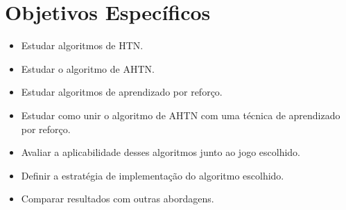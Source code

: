 \section{Objetivos Específicos}
\label{obj:esp}
\begin{itemize}
\item Estudar algoritmos de HTN.
\item Estudar o algoritmo de AHTN.
\item Estudar algoritmos de aprendizado por reforço.
\item Estudar como unir o algoritmo de AHTN com uma técnica de aprendizado por reforço. %
\item Avaliar a aplicabilidade desses algoritmos junto ao jogo escolhido.
\item Definir a estratégia de implementação do algoritmo escolhido.
\item Comparar resultados com outras abordagens.
\end{itemize}






